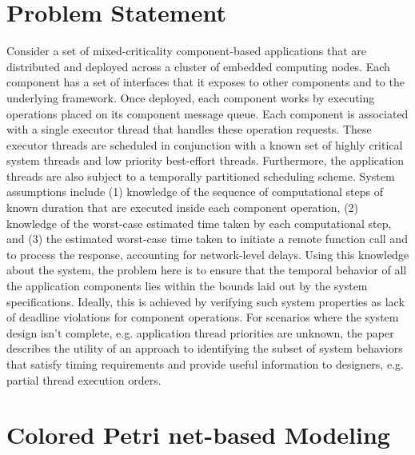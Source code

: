 \vspace{-0.2in}

\section{Problem Statement}
\label{sec:Problem_Statement}

\vspace{-0.1in}
Consider a set of mixed-criticality component-based applications that are distributed and deployed across a cluster of embedded computing nodes. Each component has a set of interfaces that it exposes to other components and to the underlying framework. Once deployed, each component works by executing operations placed on its component message queue. Each component is associated with a single executor thread that handles these operation requests. These executor threads are scheduled in conjunction with a known set of highly critical system threads and low priority best-effort threads. Furthermore, the application threads are also subject to a temporally partitioned scheduling scheme. System assumptions include (1) knowledge of the sequence of computational steps of known duration that are executed inside each component operation, (2) knowledge of the worst-case estimated time taken by each computational step, and (3) the estimated worst-case time taken to initiate a remote function call and to process the response, accounting for network-level delays. Using this knowledge about the system, the problem here is to ensure that the temporal behavior of all the application components lies within the bounds laid out by the system specifications. Ideally, this is achieved by verifying such system properties as lack of deadline violations for component operations. For scenarios where the system design isn't complete, e.g. application thread priorities are unknown, the paper describes the utility of an approach to identifying the subset of system behaviors that satisfy timing requirements and provide useful information to designers, e.g. partial thread execution orders. 

\vspace{-0.2in}   

\section{Colored Petri net-based Modeling}
\label{sec:CPN_Modeling}

\vspace{-0.1in}


